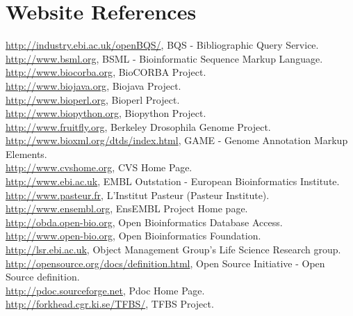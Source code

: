 \documentclass[12pt]{article}
\begin{document}
\newpage

\section{Website References}
\url{http://industry.ebi.ac.uk/openBQS/}, BQS - Bibliographic Query Service.\\
\url{http://www.bsml.org}, BSML - Bioinformatic Sequence Markup Language. \\
\url{http://www.biocorba.org}, BioCORBA Project. \\
\url{http://www.biojava.org}, Biojava Project. \\
\url{http://www.bioperl.org}, Bioperl Project. \\
\url{http://www.biopython.org}, Biopython Project. \\
\url{http://www.fruitfly.org}, Berkeley Drosophila Genome Project.\\
\url{http://www.bioxml.org/dtds/index.html},  GAME - Genome
Annotation Markup Elements. \\ 
\url{http://www.cvshome.org}, CVS Home Page. \\
\url{http://www.ebi.ac.uk}, EMBL Outstation - European Bioinformatics
Institute. \\ 
\url{http://www.pasteur.fr}, L'Institut Pasteur (Pasteur Institute). \\
\url{http://www.ensembl.org}, EnsEMBL Project Home page. \\
\url{http://obda.open-bio.org}, Open Bioinformatics Database Access. \\
\url{http://www.open-bio.org}, Open Bioinformatics Foundation. \\
\url{http://lsr.ebi.ac.uk}, Object Management Group's Life Science Research group. \\
\url{http://opensource.org/docs/definition.html}, Open Source
Initiative - Open Source definition. \\
\url{http://pdoc.sourceforge.net}, Pdoc Home Page. \\
\url{http://forkhead.cgr.ki.se/TFBS/}, TFBS Project. \\

\newpage 


\pagestyle{fancy}
\fancyhf{}
\renewcommand{\headrulewidth}{0pt}

\end{document}
